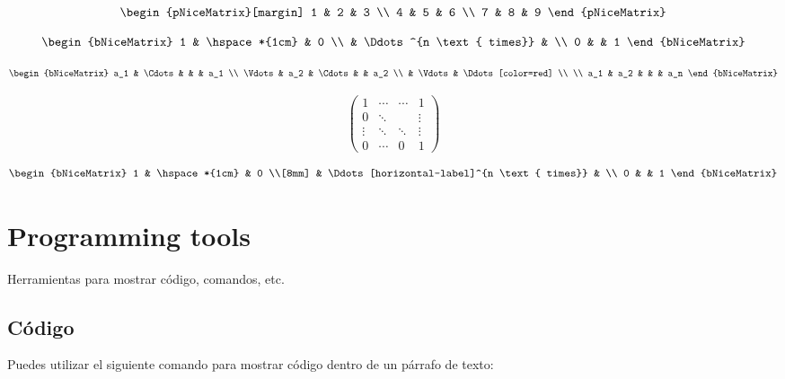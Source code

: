 	\[
	\begin{pNiceMatrix}[margin]
		1 & 2 & 3 \\
		4 & 5 & 6 \\
		7 & 8 & 9
	\end{pNiceMatrix}
	\]
	
\[
\begin{bNiceMatrix}
	1 & \hspace*{1cm} & 0 \\
	& \Ddots^{n \text{ times}} & \\
	0 & & 1
\end{bNiceMatrix}
\]

\[
\begin{bNiceMatrix}
	a_1 & \Cdots & & & a_1 \\
	\Vdots & a_2 & \Cdots & & a_2 \\
	& \Vdots & \Ddots[color=red] \\
	\\
	a_1 & a_2 & & & a_n
\end{bNiceMatrix}
\]

\[
\begin{pmatrix}
	1 & \cdots & \cdots & 1 \\
	0 & \ddots & & \vdots \\
	\vdots & \ddots & \ddots & \vdots \\
	0 & \cdots & 0 & 1
\end{pmatrix}
\]

\[
\begin{bNiceMatrix}
	1 & \hspace*{1cm} & 0 \\[8mm]
	& \Ddots[horizontal-label]^{n \text{ times}} & \\
	0 & & 1
\end{bNiceMatrix}
\]


\chapter{Programming tools}

Herramientas para mostrar código, comandos, etc.

\section{Código}

Puedes utilizar el siguiente comando para mostrar código dentro de un párrafo de texto:

